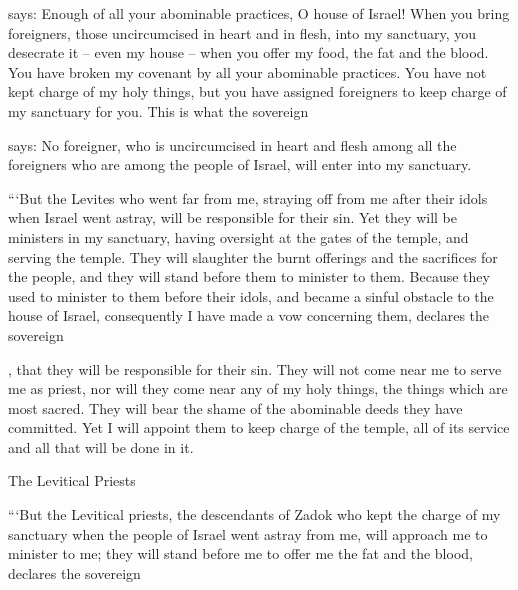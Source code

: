 {{}
says: Enough
of all
your abominable practices,
O house
of Israel!
When you bring
foreigners,
those uncircumcised
in heart
and in flesh,
into my sanctuary,
you desecrate it – even my house – when you offer my food, the fat and the blood. You have broken my covenant by all your abominable practices.
You have not
kept
charge
of my holy
things, but you have assigned
foreigners to keep
charge
of my sanctuary for you.
This is what
the sovereign

{}
says: No
foreigner,
who is uncircumcised
in heart
and flesh
among all
the foreigners
who
are among
the people
of Israel,
will enter
into
my sanctuary.
\par }{\PP {}“‘But
the Levites
who
went
far
from me, straying
off from me after
their idols
when Israel
went astray,
will be responsible
for their sin.
Yet they will be
ministers
in my sanctuary,
having oversight
at the gates
of the temple,
and serving
the
temple.
They
will slaughter
the
burnt offerings
and the
sacrifices
for the people,
and they
will stand
before
them to minister to them.
Because
they used to minister
to them
before
their idols,
and became
a sinful
obstacle
to the house
of Israel,
consequently
I have made a vow concerning
them,
declares
the sovereign

{}, that they
will be responsible
for their sin.
They will not
come near
me to
serve
me as priest, nor will they come near
any
of my holy
things, the things which
are
most sacred.
They
will bear
the shame
of the abominable deeds
they have committed.
Yet I will appoint
them
to keep
charge
of the temple,
all
of its service
and all
that
will be done in it.
\par }{\SH The Levitical Priests
\par }{\PP {}“‘But
the Levitical
priests,
the descendants
of Zadok
who
kept
the
charge
of my sanctuary
when the people of Israel
went astray
from me, will approach
me to
minister
to me; they will stand
before
me to offer
me the fat
and the blood,
declares
the sovereign

}
